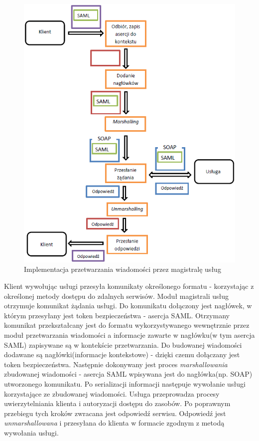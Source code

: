 	\begin{figure}[!htb]
		\centering
		\includegraphics{img/esbRoute.png}
		\caption{Implementacja przetwarzania wiadomości przez magistralę usług}
		\label{ESB route}
	\end{figure}

	Klient wywołując usługi przesyła komunikaty określonego formatu - korzystając z określonej metody dostępu do zdalnych serwisów. Moduł magistrali usług otrzymuje komunikat żądania usługi. Do komunikatu dołączony jest nagłówek, w którym przesyłany jest token bezpieczeństwa - asercja SAML. Otrzymany komunikat przekształcany jest do formatu wykorzystywanego wewnętrznie przez moduł przetwarzania wiadomości a informacje zawarte w nagłówku(w tym asercja SAML) zapisywane są w kontekście przetwarzania. Do budowanej wiadomości dodawane są nagłówki(informacje kontekstowe) - dzięki czemu dołączany jest token bezpieczeństwa. Następnie dokonywany jest proces \textit{marshallowania} zbudowanej wiadomości - asercja SAML wpisywana jest do nagłówka(np. SOAP) utworzonego komunikatu. Po serializacji informacji następuje wywołanie usługi korzystające ze zbudowanej wiadomości. Usługa przeprowadza procesy uwierzytelniania klienta i autoryzacji dostępu do zasobów. Po poprawnym przebiegu tych kroków zwracana jest odpowiedź serwisu. Odpowiedź jest \textit{unmarshallowana} i przesyłana do klienta w formacie zgodnym z metodą wywołania usługi.

